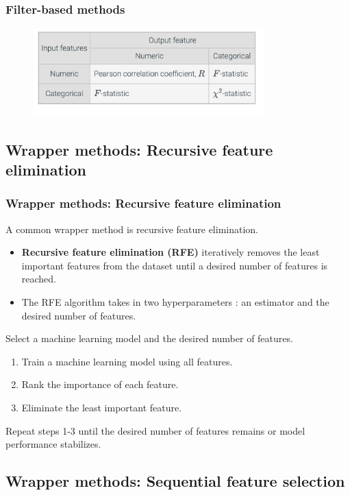 \documentclass[8pt,dvipsnames]{beamer}
\begin{document}
\begin{frame}
    \frametitle{Filter-based methods}
    \begin{figure}[ht]
        \centering
        \includegraphics[width=0.8\textwidth]{imgs/DR_4.png}
    \end{figure}
\end{frame}

\subsection{Wrapper methods: Recursive feature elimination}
\begin{frame}
    \frametitle{Wrapper methods: Recursive feature elimination}
    A common wrapper method is recursive feature elimination.
    \begin{itemize}
        \item \textbf{Recursive feature elimination (RFE)} iteratively removes the least important features from the dataset until a desired number of features is reached.
        \item The RFE algorithm takes in two hyperparameters : an estimator and the desired number of features.
    \end{itemize}
    Select a machine learning model and the desired number of features.
    \begin{enumerate}
        \item Train a machine learning model using all features.
        \item Rank the importance of each feature.
        \item Eliminate the least important feature.
    \end{enumerate}
    Repeat steps 1-3 until the desired number of features remains or model performance stabilizes.
\end{frame}

\subsection{Wrapper methods: Sequential feature selection}
\end{document}
